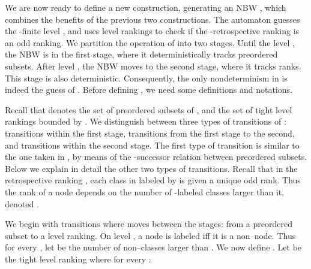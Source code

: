 \documentclass{LMCS}
\newcommand\hide[1]{}
\begin{document}
We are now ready to define a new construction, generating an NBW , which combines the benefits
of the previous two constructions.  The automaton  guesses the -finite level , and uses
level rankings to check if the -retrospective ranking is an odd ranking.  We partition the
operation of  into two stages. Until the level , the NBW  is in the first stage,
where it deterministically tracks preordered subsets.  After level , the NBW  moves to the
second stage, where it tracks ranks. This stage is also deterministic.  Consequently, the only
nondeterminism in  is indeed the guess of . Before defining , we need some
definitions and notations. 

\hide{
Lemma~\ref{Slices_Provide_Ranking} gives us an alternative odd ranking to the one of \cite{KV01c}.
We now provide an NBW that uses level rankings to guess this retrospective ranking.  In comparison
to the slice-based construction in Definition \ref{Slice_Def}, employing level rankings gives us a
tighter bound and affords further improvements, discussed later. In comparison to the rank-based
construction in Definition \ref{KVDef}, this automaton needs make only a single guess on each
accepting run: what is the -finite level .  Before and after this guess we proceed
deterministically. Before , our automaton tracks preordered subsets.  At level  our automaton
moves to ranks, and these ranks proceed stably. We thus obtain an automaton with a linear-sized
transition relation. We now introduce the machinery to define the automaton.
}

Recall that  denotes the set of preordered subsets of , and  the set of tight level
rankings bounded by .  We distinguish between three types of transitions of : transitions
within the first stage, transitions from the first stage to the second, and transitions within the
second stage.  The first type of transition is similar to the one taken in , by means of the
-successor relation between preordered subsets. Below we explain in detail the other two
types of transitions.
Recall that in the retrospective ranking , each class in 
labeled  by  is given a unique odd rank. Thus the rank of a node  depends on the
number of -labeled classes larger than it, denoted .

We begin with transitions where  moves between the stages: from a preordered subset
 to a level ranking.  On level , a node is labeled  iff it is a
non--node.  Thus for every , let
\mid be the number of non--classes
larger than . We now define . Let
 be the tight level ranking  where for every : 
\end{document}
